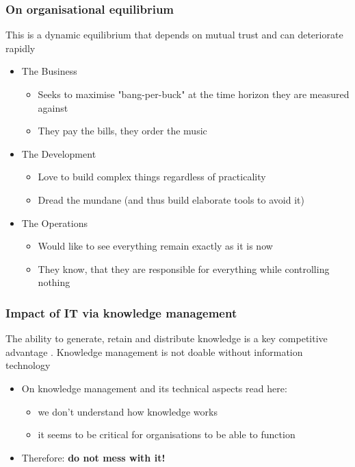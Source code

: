 \begin{frame}
	\frametitle{On organisational equilibrium}
	This is a dynamic equilibrium that depends on mutual trust and can deteriorate rapidly
	\begin{itemize}
		\item The Business
		\begin{itemize}
			\item Seeks to maximise "bang-per-buck" at the time horizon they are measured against
			\item They pay the bills, they order the music
		\end{itemize}
		\item The Development
		\begin{itemize}
			\item Love to build complex things regardless of practicality
			\item Dread the mundane (and thus build elaborate tools to avoid it)
		\end{itemize}
		\item The Operations
		\begin{itemize}
			\item Would like to see everything remain exactly as it is now
			\item They know, that they are responsible for everything while controlling nothing
		\end{itemize}
	\end{itemize}
\end{frame}

\begin{frame}[fragile]
  \frametitle{Impact of IT via knowledge management}
  The ability to generate, retain and distribute knowledge is a key competitive advantage \citep{david2000diagnosing}. Knowledge management is not doable without information technology
  	\begin{itemize}
		\item On knowledge management and its technical aspects read here: \citep{15.905}
		\begin{itemize}	
			\item we don't understand how knowledge works
			\item it seems to be critical for organisations to be able to function
		\end{itemize}
		\item Therefore: \textbf{do not mess with it!}
	\end{itemize}
\end{frame}

